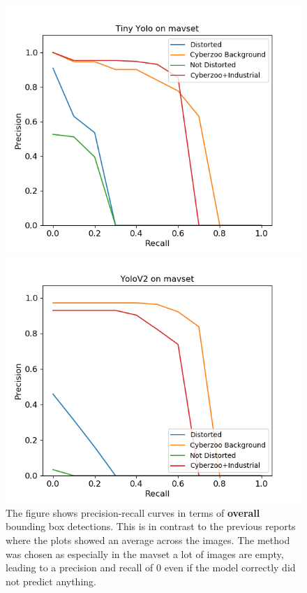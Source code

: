\documentclass{article}
\begin{document}
\begin{figure}[h]
	\centering
	\begin{minipage}{0.45\textwidth}
		\centering
	\includegraphics[width=\textwidth]{fig/tiny}
	\end{minipage}
	\begin{minipage}{0.45\textwidth}
		\centering
	\includegraphics[width=\textwidth]{fig/yolov2}
	\end{minipage}
	\label{fig:mavset}
	\caption{The figure shows precision-recall curves in terms of \textbf{overall} bounding box detections. This is in contrast to the previous reports where the plots showed an average across the images. The method was chosen as especially in the mavset a lot of images are empty, leading to a precision and recall of 0 even if the model correctly did not predict anything.}
\end{figure}
\end{document}
